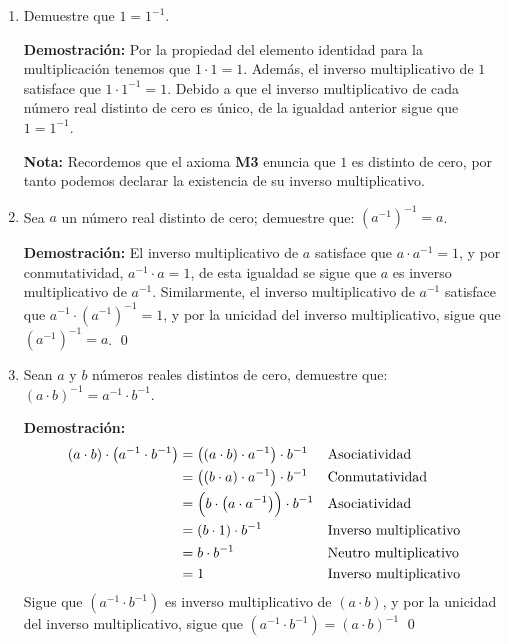 \documentclass[11pt]{article}
\begin{document}
\begin{enumerate}[label=\alph*)]
        \item Demuestre que $1=1^{-1}$.
        
        \textbf{Demostración:} Por la propiedad del elemento identidad para la multiplicación tenemos que $1\cdot 1 = 1$. Además, el inverso multiplicativo de $1$ satisface que $1 \cdot 1^{-1}=1$. Debido a que el inverso multiplicativo de cada número real distinto de cero es único, de la igualdad anterior sigue que $1=1^{-1}$.

        \textbf{Nota:} Recordemos que el axioma \textbf{M3} enuncia que $1$ es distinto de cero, por tanto podemos declarar la existencia de su inverso multiplicativo.

        \item Sea $a$ un número real distinto de cero; demuestre que: $\left( a^{-1} \right)^{-1}=a$.
        
        \textbf{Demostración:} El inverso multiplicativo de $a$ satisface que $a\cdot a^{-1}=1$, y por conmutatividad, $a^{-1} \cdot a=1$, de esta igualdad se sigue que $a$ es inverso multiplicativo de $a^{-1}$. Similarmente, el inverso multiplicativo de $a^{-1}$ satisface que $ a^{-1} \cdot \left( a^{-1} \right)^{-1} =1$, y por la unicidad del inverso multiplicativo, sigue que $\left( a^{-1} \right)^{-1}=a$. \qed

        \item Sean $a$ y $b$ números reales distintos de cero, demuestre que: $(a \cdot b)^{-1}=a^{-1} \cdot b^{-1}$.
         
        \textbf{Demostración:} \begin{align*}
            \left(a \cdot b \right) \cdot  \left(a^{-1} \cdot b^{-1}  \right)	&=	 \left( \left(a \cdot b\right) \cdot a^{-1}  \right) \cdot b^{-1}  	&& \text{Asociatividad}\\
        &=	 \left( \left(b\cdot a \right) \cdot a^{-1}  \right) \cdot b^{-1}  	&& \text{Conmutatividad}\\
        &=	 \Bigl(b\cdot  \left(a \cdot a^{-1}\right) \Bigr) \cdot b^{-1}	&& \text{Asociatividad}\\
        &=	 \left(b\cdot 1 \right) \cdot b^{-1}	&& \text{Inverso multiplicativo}\\
        &=	b\cdot b^{-1}	&& \text{Neutro multiplicativo}\\
        &=	1	&& \text{Inverso multiplicativo}
        \end{align*}
        Sigue que $\left(a^{-1} \cdot b^{-1} \right)$ es inverso multiplicativo de $\left( a \cdot b\right)$, y por la unicidad del inverso multiplicativo, sigue que $\left(a^{-1} \cdot b^{-1} \right) = \left( a \cdot b\right)^{-1}$ \qed


\end{enumerate}
\end{document}
